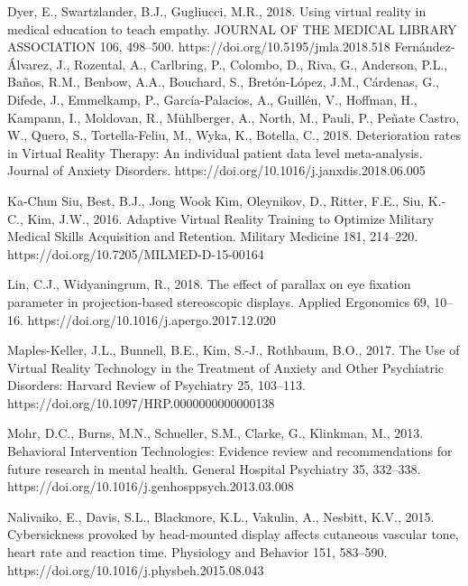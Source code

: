 \documentclass[10pt,journal,compsoc]{IEEEtran}
\begin{document}
	\begin{thebibliography}{1}
		
	\bibitem {}
Dyer, E., Swartzlander, B.J., Gugliucci, M.R., 2018. Using virtual reality in medical education to teach empathy. JOURNAL OF THE MEDICAL LIBRARY ASSOCIATION 106, 498–500. https://doi.org/10.5195/jmla.2018.518 \newline
\bibitem {}
Fernández-Álvarez, J., Rozental, A., Carlbring, P., Colombo, D., Riva, G., Anderson, P.L., Baños, R.M., Benbow, A.A., Bouchard, S., Bretón-López, J.M., Cárdenas, G., Difede, J., Emmelkamp, P., García-Palacios, A., Guillén, V., Hoffman, H., Kampann, I., Moldovan, R., Mühlberger, A., North, M., Pauli, P., Peñate Castro, W., Quero, S., Tortella-Feliu, M., Wyka, K., Botella, C., 2018. Deterioration rates in Virtual Reality Therapy: An individual patient data level meta-analysis. Journal of Anxiety Disorders. https://doi.org/10.1016/j.janxdis.2018.06.005\newline
\bibitem {}

Ka-Chun Siu, Best, B.J., Jong Wook Kim, Oleynikov, D., Ritter, F.E., Siu, K.-C., Kim, J.W., 2016. Adaptive Virtual Reality Training to Optimize Military Medical Skills Acquisition and Retention. Military Medicine 181, 214–220. https://doi.org/10.7205/MILMED-D-15-00164\newline
\bibitem {}

Lin, C.J., Widyaningrum, R., 2018. The effect of parallax on eye fixation parameter in projection-based stereoscopic displays. Applied Ergonomics 69, 10–16. https://doi.org/10.1016/j.apergo.2017.12.020\newline
\bibitem {}

Maples-Keller, J.L., Bunnell, B.E., Kim, S.-J., Rothbaum, B.O., 2017. The Use of Virtual Reality Technology in the Treatment of Anxiety and Other Psychiatric Disorders: Harvard Review of Psychiatry 25, 103–113. https://doi.org/10.1097/HRP.0000000000000138\newline
\bibitem {}

Mohr, D.C., Burns, M.N., Schueller, S.M., Clarke, G., Klinkman, M., 2013. Behavioral Intervention Technologies: Evidence review and recommendations for future research in mental health. General Hospital Psychiatry 35, 332–338. https://doi.org/10.1016/j.genhosppsych.2013.03.008\newline
\bibitem {}

Nalivaiko, E., Davis, S.L., Blackmore, K.L., Vakulin, A., Nesbitt, K.V., 2015. Cybersickness provoked by head-mounted display affects cutaneous vascular tone, heart rate and reaction time. Physiology and Behavior 151, 583–590. https://doi.org/10.1016/j.physbeh.2015.08.043\newline
\bibitem {}


\end{thebibliography}
\end{document}
